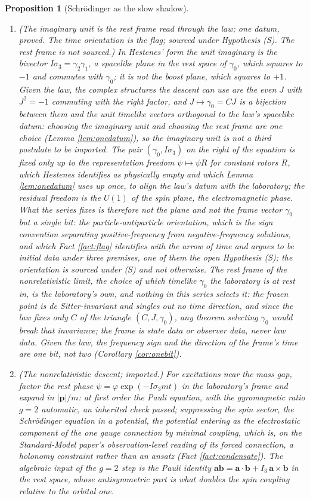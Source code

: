 \documentclass[11pt]{article}
\newtheorem{proposition}[theorem]{Proposition}
\theoremstyle{definition}
\begin{document}
\begin{proposition}[Schr\"odinger as the slow shadow]
\begin{enumerate}
\item \emph{(The imaginary unit is the rest frame read through the law; one datum, proved. The time orientation is the flag; sourced under Hypothesis (S). The rest frame is not sourced.)} In Hestenes' form the unit imaginary is the bivector $I\sigma_{3} = \gamma_{2}\gamma_{1}$, a spacelike plane in the rest space of $\gamma_{0}$, which squares to $-1$ and commutes with $\gamma_{0}$; it is not the boost plane, which squares to $+1$. Given the law, the complex structures the descent can use are the even $J$ with $J^{2} = -1$ commuting with the right factor, and $J \mapsto \gamma_{0} = CJ$ is a bijection between them and the unit timelike vectors orthogonal to the law's spacelike datum: choosing the imaginary unit and choosing the rest frame are one choice (Lemma \ref{lem:onedatum}), so the imaginary unit is not a third postulate to be imported. The pair $(\gamma_{0}, I\sigma_{3})$ on the right of the equation is fixed only up to the representation freedom $\psi \mapsto \psi R$ for constant rotors $R$, which Hestenes identifies as physically empty and which Lemma \ref{lem:onedatum} uses up once, to align the law's datum with the laboratory; the residual freedom is the $U(1)$ of the spin plane, the electromagnetic phase. What the series fixes is therefore not the plane and not the frame vector $\gamma_{0}$ but a single bit: the particle-antiparticle orientation, which is the sign convention separating positive-frequency from negative-frequency solutions, and which Fact \ref{fact:flag} identifies with the arrow of time and argues to be initial data under three premises, one of them the open Hypothesis (S); the orientation is sourced under (S) and not otherwise. The \emph{rest frame} of the nonrelativistic limit, the choice of which timelike $\gamma_{0}$ the laboratory is at rest in, is the laboratory's own, and nothing in this series selects it: the frozen point is de Sitter-invariant and singles out no time direction, and since the law fixes only $C$ of the triangle $(C, J, \gamma_{0})$, any theorem selecting $\gamma_{0}$ would break that invariance; the frame is state data or observer data, never law data. Given the law, the frequency sign and the direction of the frame's time are one bit, not two (Corollary \ref{cor:onebit}).
\item \emph{(The nonrelativistic descent; imported.)} For excitations near the mass gap, factor the rest phase $\psi = \varphi\exp(-I\sigma_{3}mt)$ in the laboratory's frame and expand in $|\mathbf{p}|/m$: at first order the Pauli equation, with the gyromagnetic ratio $g = 2$ automatic, an inherited check passed; suppressing the spin sector, the Schr\"odinger equation in a potential, the potential entering as the electrostatic component of the one gauge connection by minimal coupling, which is, on the Standard-Model paper's observation-level reading of its forced connection, a holonomy constraint rather than an ansatz (Fact \ref{fact:condensate}). The algebraic input of the $g = 2$ step is the Pauli identity $\mathbf{a}\mathbf{b} = \mathbf{a}\cdot\mathbf{b} + I_{3}\,\mathbf{a}\times\mathbf{b}$ in the rest space, whose antisymmetric part is what doubles the spin coupling relative to the orbital one.

\end{enumerate}
\end{proposition}
\end{document}
